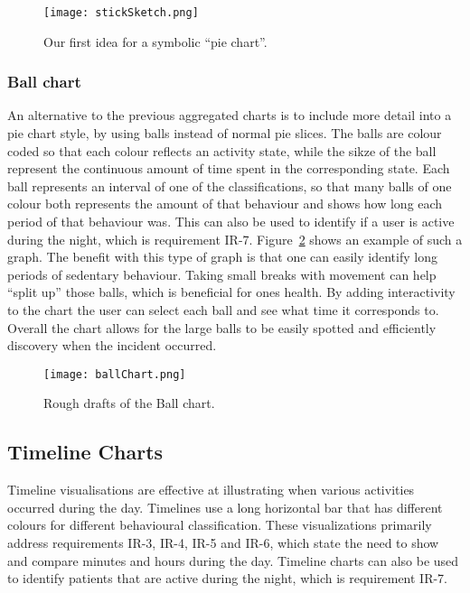 \begin{figure}[h!]
	\centering
		\texttt{[image: stickSketch.png]}
		\caption[F2 sketch]{Our first idea for a symbolic ``pie chart''.}
		\label{fig:symbolicPie}
\end{figure}

\subsubsection{Ball chart}
An alternative to the previous aggregated charts is to include more detail into a pie chart style, by using balls instead of normal pie slices. The balls are colour coded so that each colour reflects an activity state, while the sikze of the ball represent the continuous amount of time spent in the corresponding state. Each ball represents an interval of one of the classifications, so that many balls of one colour both represents the amount of that behaviour and shows how long each period of that behaviour was. This can also be used to identify if a user is active during the night, which is requirement IR-7. Figure~\ref{fig:ballChart} shows an example of such a graph. The benefit with this type of graph is that one can easily identify long periods of sedentary behaviour. Taking small breaks with movement can help ``split up'' those balls, which is beneficial for ones health. By adding interactivity to the chart the user can select each ball and see what time it corresponds to. Overall the chart allows for the large balls to be easily spotted and efficiently discovery when the incident occurred.

\begin{figure}[h!]
	\centering
		\texttt{[image: ballChart.png]}
		\caption[F3 sketch]{Rough drafts of the Ball chart.}
		\label{fig:ballChart}
\end{figure}

\subsection{Timeline Charts}
Timeline visualisations are effective at illustrating when various activities occurred during the day. Timelines use a long horizontal bar that has different colours for different behavioural classification. These visualizations primarily address requirements IR-3, IR-4, IR-5 and IR-6, which state the need to show and compare minutes and hours during the day. Timeline charts can also be used to identify patients that are active during the night, which is requirement IR-7.

